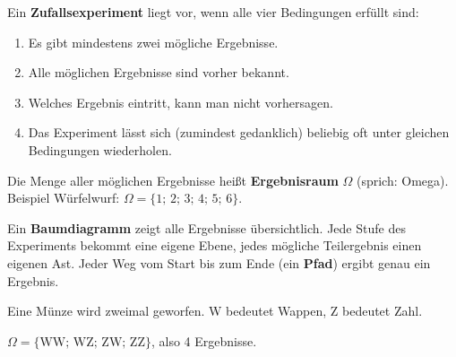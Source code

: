\begin{merkbox}
Ein \textbf{Zufallsexperiment} liegt vor, wenn alle vier Bedingungen erfüllt sind:
\begin{enumerate}[label=\arabic*.]
    \item Es gibt mindestens zwei mögliche Ergebnisse.
    \item Alle möglichen Ergebnisse sind vorher bekannt.
    \item Welches Ergebnis eintritt, kann man nicht vorhersagen.
    \item Das Experiment lässt sich (zumindest gedanklich) beliebig oft unter gleichen Bedingungen wiederholen.
\end{enumerate}
Die Menge aller möglichen Ergebnisse heißt \textbf{Ergebnisraum} $\Omega$ (sprich: Omega).\\
Beispiel Würfelwurf: $\Omega = \{1;\,2;\,3;\,4;\,5;\,6\}$.
\end{merkbox}

\begin{merkbox}
Ein \textbf{Baumdiagramm} zeigt alle Ergebnisse übersichtlich. Jede Stufe des Experiments bekommt eine eigene Ebene, jedes mögliche Teilergebnis einen eigenen Ast. Jeder Weg vom Start bis zum Ende (ein \textbf{Pfad}) ergibt genau ein Ergebnis.
\end{merkbox}

\begin{beispielbox}
Eine Münze wird zweimal geworfen. W bedeutet Wappen, Z bedeutet Zahl.
\begin{center}
\end{center}
$\Omega = \{\text{WW};\,\text{WZ};\,\text{ZW};\,\text{ZZ}\}$, also 4 Ergebnisse.
\end{beispielbox}
